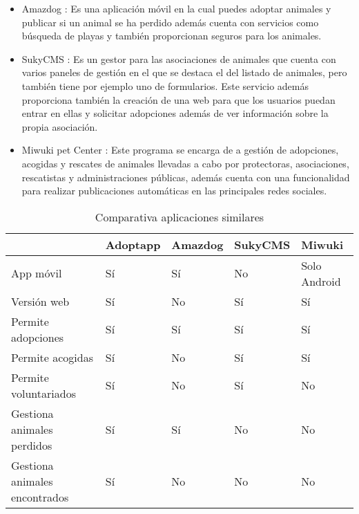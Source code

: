 \begin{itemize}
	\item Amazdog \cite{amazdog}: Es una aplicación móvil en la cual puedes adoptar animales y publicar si un animal se ha perdido además cuenta con servicios como búsqueda de playas y también proporcionan seguros para los animales.
	
	\item SukyCMS \cite{sukycms}: Es un gestor para las asociaciones de animales que cuenta con varios paneles de gestión en el que se destaca el del listado de animales, pero también tiene por ejemplo uno de formularios. Este servicio además proporciona también la creación de una web para que los usuarios puedan entrar en ellas y solicitar adopciones además de ver información sobre la propia asociación.
	
	\item Miwuki pet Center \cite{miwuki}: Este programa se encarga de a gestión de adopciones, acogidas y rescates de animales llevadas a cabo por protectoras, asociaciones, rescatistas y administraciones públicas, además cuenta con una funcionalidad para realizar publicaciones automáticas en las principales redes sociales.
	 
\end{itemize}

\begin{table}[H] %
	\centering
	\begin{tabular}{|p{3cm}|l|l|l|l|} \hline 
		& \textbf{Adoptapp} & \textbf{Amazdog} & \textbf{SukyCMS} & \textbf{Miwuki} \\ \hline
		App móvil & Sí & Sí & No & Solo Android \\ \hline
		Versión web	& Sí & No & Sí &  Sí \\ \hline
		Permite adopciones & Sí & Sí & Sí & Sí \\ \hline
		Permite acogidas & Sí & No & Sí & Sí \\ \hline
		Permite voluntariados & Sí & No & Sí & No \\ \hline
		Gestiona animales perdidos & Sí & Sí & No & No \\ \hline
		Gestiona animales encontrados & Sí & No & No & No \\ \hline
		
    \end{tabular}
		\caption{Comparativa aplicaciones similares}
		\label{tab:appsSimilares}
	\end{table}